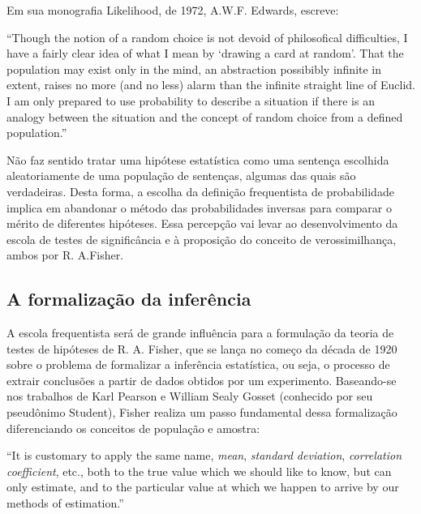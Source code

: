 Em sua monografia Likelihood, de 1972, A.W.F. Edwards, escreve:

``Though the notion of a random choice is not devoid of philosofical difficulties, I have a fairly clear idea of what I mean
by `drawing a card at random'. That the population may exist only in the mind, an abstraction possibibly infinite in extent,
raises no more (and no less) alarm than the infinite straight line of Euclid. I am only prepared to use probability to describe
a situation if there is an analogy between the situation and the concept of random choice from a defined population.''
\cite{Edwards72}

Não faz sentido tratar uma hipótese estatística como uma sentença escolhida aleatoriamente de uma população de sentenças, algumas
das quais são verdadeiras. Desta forma, a escolha da definição frequentista de probabilidade implica em abandonar o método
das probabilidades inversas para comparar o mérito de diferentes hipóteses. Essa percepção vai levar ao desenvolvimento
da escola de testes de significância e à proposição do conceito de verossimilhança, ambos por R. A.Fisher.

\subsection{A formalização da inferência}

A escola frequentista será de grande influência para a formulação da teoria de testes de hipóteses de R. A. Fisher, que se
lança no começo da década de 1920 sobre o problema de formalizar a inferência estatística, ou seja, o processo de
extrair conclusões a partir de dados obtidos por um experimento. Baseando-se nos trabalhos de Karl Pearson e William Sealy Gosset
(conhecido por seu pseudônimo Student), Fisher realiza um passo fundamental dessa formalização
diferenciando os conceitos de população e amostra:

``It is customary to apply the same name, {\em mean}, {\em standard deviation}, {\em correlation coefficient}, etc., both 
to the true value which we should like to know, but can only estimate, and to the particular value at which we happen 
to arrive by our methods of estimation.''\cite{Fisher1922}

